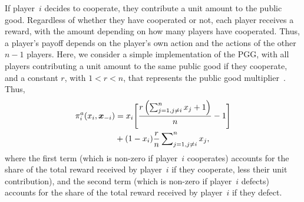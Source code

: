 \documentclass[letterpaper, 10 pt, conference]{ieeeconf}  %
\newcommand{\vect}[1]{\boldsymbol{#1}}
\newtheorem{remark}{Remark}
\begin{document}
If player~$i$ decides to cooperate, they contribute a unit amount to the public good. Regardless of whether they have cooperated or not, each player receives a reward, with the amount depending on how many players have cooperated. 
Thus, a player's payoff depends on the player's own action and the actions of the other $n-1$ players. Here, we consider a simple implementation of the PGG, with all players contributing a unit amount to the same public good if they cooperate, and a constant $r$, with $1<r<n$, that represents the public good multiplier~\cite{Bramoull2007, govaert_rationality_2021}. Thus,
\begin{align}\label{eq:payoff_PGG}
    \pi_i^{a}(x_i,\vect{x}_{-i}) &= x_i \Bigg[  \dfrac{r\left(\sum^n_{j=1, j\neq i}x_j + 1\right)}{n} -1 \Bigg] \notag \\ 
    &+ (1-x_i)\dfrac{r}{n}\sum\nolimits^n_{j=1, j\neq i}x_j,
\end{align}
where the first term (which is non-zero if player~$i$ cooperates) accounts for the share of the total reward received by player~$i$ if they cooperate, less their unit contribution), and the second term (which is non-zero if player~$i$ defects) accounts for the share of the total reward received by player~$i$ if they defect. 

\end{document}
